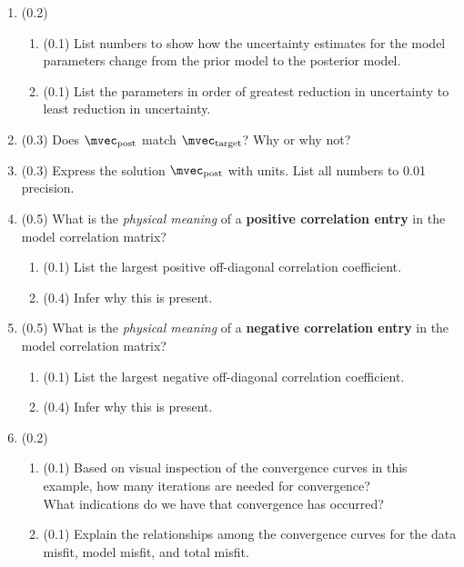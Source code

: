 \documentclass[11pt,titlepage,fleqn]{article}
\begin{document}
\begin{enumerate}

\item (0.2)
\begin{enumerate}
\item (0.1) List numbers to show how the uncertainty estimates for the model parameters change from the prior model to the posterior model.
\item (0.1) List the parameters in order of greatest reduction in uncertainty to least reduction in uncertainty.
\end{enumerate}


\item (0.3) Does $\mvec_{\rm post}$ match $\mvec_{\rm target}$? Why or why not?


\item (0.3) Express the solution $\mvec_{\rm post}$ with units. List all numbers to 0.01 precision.


\item (0.5) What is the {\em physical meaning} of a {\bf positive correlation entry} in the model correlation matrix?
\begin{enumerate}
\item (0.1) List the largest positive off-diagonal correlation coefficient.
\item (0.4) Infer why this is present.
\end{enumerate}


\item (0.5) What is the {\em physical meaning} of a {\bf negative correlation entry} in the model correlation matrix?
\begin{enumerate}
\item (0.1) List the largest negative off-diagonal correlation coefficient.
\item (0.4) Infer why this is present.
\end{enumerate}


\item (0.2)
%
\begin{enumerate}
\item (0.1) Based on visual inspection of the convergence curves in this example, how many iterations are needed for convergence? \\
  What indications do we have that convergence has occurred?
\item (0.1) Explain the relationships among the convergence curves for the data misfit, model misfit, and total misfit.
\end{enumerate}


\end{enumerate}
\end{document}
